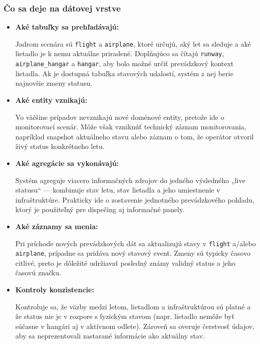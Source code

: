 \documentclass[11pt, a4paper]{article}
\begin{document}
\subsubsection*{Čo sa deje na dátovej vrstve}
\begin{itemize}
    \item \textbf{Aké tabuľky sa prehľadávajú:} 
    
    Jadrom scenára sú \texttt{flight} a \texttt{airplane}, ktoré určujú, aký let sa sleduje a aké lietadlo je k nemu aktuálne priradené. Doplňujúco sa čítajú \texttt{runway}, \texttt{airplane\_hangar} a \texttt{hangar}, aby bolo možné určiť prevádzkový kontext lietadla. Ak je dostupná tabuľka stavových udalostí, systém z nej berie najnovšie zmeny statusu.
    
    \item \textbf{Aké entity vznikajú:} 
    
    Vo väčšine prípadov nevznikajú nové doménové entity, pretože ide o monitorovací scenár. Môže však vzniknúť technický záznam monitorovania, napríklad snapshot aktuálneho stavu alebo záznam o tom, že operátor otvoril živý status konkrétneho letu.
    
    \item \textbf{Aké agregácie sa vykonávajú:} 
    
    Systém agreguje viacero informačných zdrojov do jedného výsledného „live statusu“ — kombinuje stav letu, stav lietadla a jeho umiestnenie v infraštruktúre. Prakticky ide o zostavenie jednotného prevádzkového pohľadu, ktorý je použiteľný pre dispečing aj informačné panely.
    
    \item \textbf{Aké záznamy sa menia:} 
    
    Pri príchode nových prevádzkových dát sa aktualizujú stavy v \texttt{flight} a/alebo \texttt{airplane}, prípadne sa pridáva nový stavový event. Zmeny sú typicky časovo citlivé, preto je dôležité udržiavať posledný známy validný status a jeho časovú značku.
    
    \item \textbf{Kontroly konzistencie:} 
    
    Kontroluje sa, že väzby medzi letom, lietadlom a infraštruktúrou sú platné a že status nie je v rozpore s fyzickým stavom (napr. lietadlo nemôže byť súčasne v hangári aj v aktívnom odlete). Zároveň sa overuje čerstvosť údajov, aby sa neprezentovali zastarané informácie ako aktuálny stav.
\end{itemize}
\end{document}
